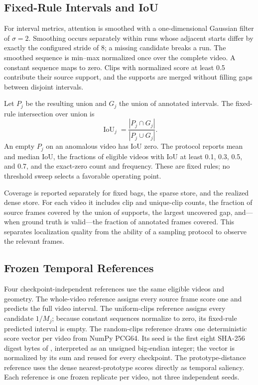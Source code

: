\subsection{Fixed-Rule Intervals and IoU}

For interval metrics, attention is smoothed with a one-dimensional Gaussian filter of $\sigma=2$. Smoothing occurs separately within runs whose adjacent starts differ by exactly the configured stride of 8; a missing candidate breaks a run. The smoothed sequence is min--max normalized once over the complete video. A constant sequence maps to zero. Clips with normalized score at least 0.5 contribute their source support, and the supports are merged without filling gaps between disjoint intervals.

Let $P_j$ be the resulting union and $G_j$ the union of annotated intervals. The fixed-rule intersection over union is
\begin{equation}
    \operatorname{IoU}_j
    =\frac{|P_j\cap G_j|}{|P_j\cup G_j|}.
\end{equation}
An empty $P_j$ on an anomalous video has IoU zero. The protocol reports mean and median IoU, the fractions of eligible videos with IoU at least 0.1, 0.3, 0.5, and 0.7, and the exact-zero count and frequency. These are fixed rules; no threshold sweep selects a favorable operating point.

Coverage is reported separately for fixed bags, the sparse store, and the realized dense store. For each video it includes clip and unique-clip counts, the fraction of source frames covered by the union of supports, the largest uncovered gap, and---when ground truth is valid---the fraction of annotated frames covered. This separates localization quality from the ability of a sampling protocol to observe the relevant frames.

\subsection{Frozen Temporal References}

Four checkpoint-independent references use the same eligible videos and geometry. The whole-video reference assigns every source frame score one and predicts the full video interval. The uniform-clips reference assigns every candidate $1/M_j$; because constant sequences normalize to zero, its fixed-rule predicted interval is empty. The random-clips reference draws one deterministic  score vector per video from NumPy PCG64. Its seed is the first eight SHA-256 digest bytes of , interpreted as an unsigned big-endian integer; the vector is normalized by its sum and reused for every checkpoint. The prototype-distance reference uses the dense nearest-prototype scores directly as temporal saliency. Each reference is one frozen replicate per video, not three independent seeds.

